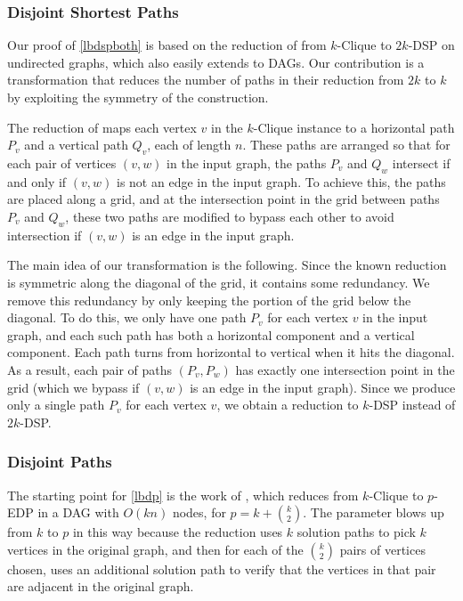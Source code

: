 \documentclass[11pt]{article}
\theoremstyle{definition}
\begin{document}
\subsubsection*{Disjoint Shortest Paths}

Our proof of \cref{lbdspboth} is based on the reduction of 
\cite[Proposition 1]{Geometric-Lens} from \textsf{$k$-Clique} to $2k$-\textsf{DSP} on undirected graphs, which also easily extends to DAGs. %
Our contribution is a transformation that reduces the number of paths in their reduction from $2k$ to $k$ by exploiting the symmetry of the construction. 

The reduction of \cite{Geometric-Lens} maps each vertex $v$ in the \textsf{$k$-Clique} instance to a horizontal path $P_v$ and a vertical path $Q_v$, each of length $n$. These paths are arranged so that for each pair of vertices $(v,w)$ in the input graph, the paths $P_v$ and $Q_w$ intersect if and only if $(v,w)$ is not an edge in the input graph. To achieve this, the paths are placed along a grid, and at the intersection point in the grid between paths $P_v$ and $Q_w$, these two paths are modified to bypass each other to avoid intersection if $(v,w)$ is an edge in the input graph.

The main idea of our transformation is the following. Since the known reduction is symmetric along the diagonal of the grid, it contains some redundancy. 
We remove this redundancy by only keeping the portion of the grid below the diagonal. 
To do this, we only have one path $P_v$ for each vertex $v$ in the input graph, and each such path has both a horizontal component and a vertical component. Each path turns from horizontal to vertical when it hits the diagonal. 
As a result, each pair of paths $(P_v, P_w)$ has exactly one intersection point in the grid (which we bypass if $(v,w)$ is an edge in the input graph). 
Since we produce only a single path $P_v$ for each vertex $v$, we obtain a reduction to $k$-\textsf{DSP} instead of $2k$-\textsf{DSP}.


\subsubsection*{Disjoint Paths}

The starting point for \cref{lbdp} is the work of \cite{Slivkins2010}, which reduces from \textsf{$k$-Clique} to \textsf{$p$-EDP} in a DAG with $O(kn)$ nodes, for $p=k + \binom{k}{2}$. 
The parameter blows up from $k$ to $p$ in this way because the reduction uses $k$ solution paths to pick $k$ vertices in the original graph, and then for each of the $\binom{k}{2}$ pairs of vertices chosen, uses an additional solution path to verify that the vertices in that pair are adjacent in the original graph. 
\end{document}
